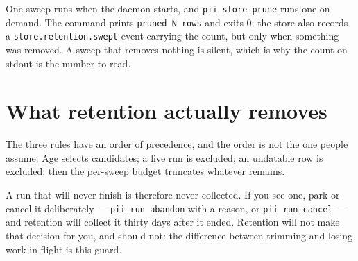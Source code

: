 One sweep runs when the daemon starts, and \texttt{pii store prune} runs one on demand. The
command prints \texttt{pruned N rows} and exits 0; the store also records a
\texttt{store.retention.swept} event carrying the count, but only when something was
removed. A sweep that removes nothing is silent, which is why the count on stdout is the
number to read.

\section{What retention actually removes}

The three rules have an order of precedence, and the order is not the one people assume.
Age selects candidates; a live run is excluded; an undatable row is excluded; then the
per-sweep budget truncates whatever remains.

\begin{center}
\end{center}

A run that will never finish is therefore never collected. If you see one, park or cancel
it deliberately --- \texttt{pii run abandon} with a reason, or \texttt{pii run cancel} ---
and retention will collect it thirty days after it ended. Retention will not make that
decision for you, and should not: the difference between trimming and losing work in flight
is this guard.

